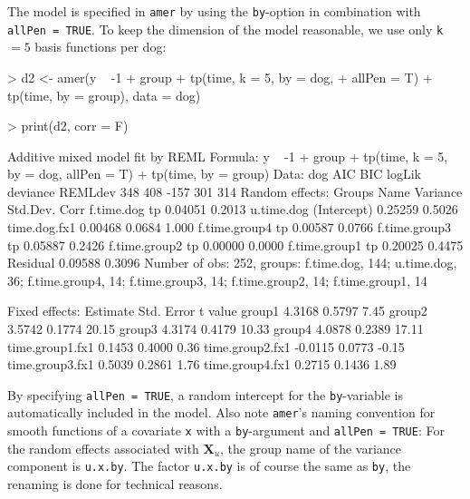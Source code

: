 \documentclass[12pt]{article}
\newenvironment{Schunk}{}{}
\newcommand{\code}[1]{\texttt{\small{#1}}}
\begin{document}
The model is specified in \code{amer} by using the \code{by}-option in
combination with \code{allPen = TRUE}. To keep the dimension of the model
reasonable, we use only \code{k}$=5$ basis functions per dog:
\begin{Schunk}
\begin{Sinput}
> d2 <- amer(y ~ -1 + group + tp(time, k = 5, by = dog, 
+     allPen = T) + tp(time, by = group), data = dog)
\end{Sinput}
\end{Schunk}
\begin{Schunk}
\begin{Sinput}
> print(d2, corr = F)
\end{Sinput}
\begin{Soutput}
Additive mixed model fit by REML 
Formula: y ~ -1 + group + tp(time, k = 5, by = dog, allPen = T) + tp(time,      by = group) 
   Data: dog 
 AIC BIC logLik deviance REMLdev
 348 408   -157      301     314
Random effects:
 Groups        Name         Variance Std.Dev. Corr  
 f.time.dog    tp           0.04051  0.2013         
 u.time.dog    (Intercept)  0.25259  0.5026         
               time.dog.fx1 0.00468  0.0684   1.000 
 f.time.group4 tp           0.00587  0.0766         
 f.time.group3 tp           0.05887  0.2426         
 f.time.group2 tp           0.00000  0.0000         
 f.time.group1 tp           0.20025  0.4475         
 Residual                   0.09588  0.3096         
Number of obs: 252, groups: f.time.dog, 144; u.time.dog, 36; f.time.group4, 14; f.time.group3, 14; f.time.group2, 14; f.time.group1, 14

Fixed effects:
                Estimate Std. Error t value
group1            4.3168     0.5797    7.45
group2            3.5742     0.1774   20.15
group3            4.3174     0.4179   10.33
group4            4.0878     0.2389   17.11
time.group1.fx1   0.1453     0.4000    0.36
time.group2.fx1  -0.0115     0.0773   -0.15
time.group3.fx1   0.5039     0.2861    1.76
time.group4.fx1   0.2715     0.1436    1.89
\end{Soutput}
\end{Schunk}
By specifying \code{allPen = TRUE}, a random intercept for the \code{by}-variable
is automatically included in the model. Also note \code{amer}'s naming convention
for smooth functions of a covariate \code{x} with a \code{by}-argument and
\code{allPen = TRUE}: For the random effects associated with $\bm X_u$, the group
name of the variance component is \code{u.x.by}. The factor \code{u.x.by} is of
course the same as \code{by}, the renaming is done for technical reasons.
\end{document}
